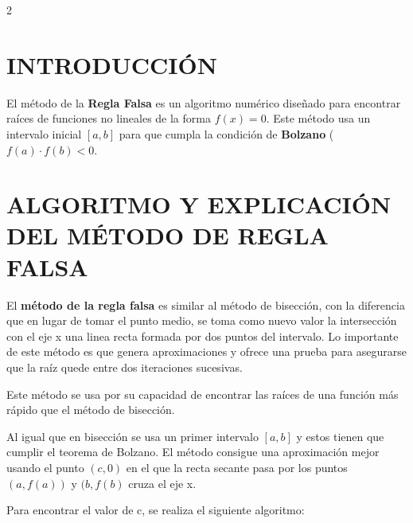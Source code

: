 \documentclass{rmf-d}
\begin{document}
\begin{multicols}{2}

\section{INTRODUCCIÓN}
\label{sec:1}
El método de la \textbf{Regla Falsa} es un algoritmo numérico diseñado para encontrar raíces de funciones no lineales de la forma $f(x) = 0 $. Este método usa un intervalo inicial $[a,b]$ para que cumpla la condición de \textbf{Bolzano} ($f(a) \cdot f(b) < 0$.

































\section{ALGORITMO Y EXPLICACIÓN DEL
MÉTODO DE REGLA FALSA}
\label{sec:2}
El \textbf{método de la regla falsa} es similar al método de bisección, con la diferencia que en lugar de tomar el punto medio, se toma como nuevo valor la intersección con el eje x una linea recta formada por dos puntos del intervalo. Lo importante de este método es que genera aproximaciones y ofrece una prueba para asegurarse que la raíz quede entre dos iteraciones sucesivas.

Este método se usa por su capacidad de encontrar las raíces de una función más rápido que el método de bisección.

Al igual que en bisección se usa un primer intervalo $[a,b]$ y estos tienen que cumplir el teorema de Bolzano. El método  consigue una aproximación mejor usando el punto $(c,0)$ en el que la recta secante pasa por los puntos $(a,f(a))$ y $(b,f(b)$ cruza el eje x.

Para encontrar el valor de c, se realiza el siguiente algoritmo:


\end{multicols}
\end{document}
